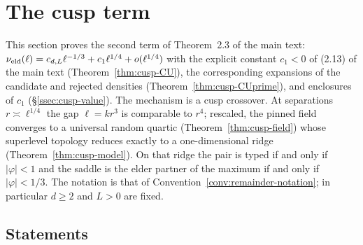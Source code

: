 \section{The cusp term}\label{sec:cusp}

This section proves the second term of Theorem~2.3 of the main text: $\nu_{\mathrm{eld}}(\ell)=c_{d,L}\ell^{-1/3}+c_1\ell^{1/4}+o(\ell^{1/4})$ with the explicit constant $c_1<0$ of (2.13) of the main text (Theorem~\ref{thm:cusp-CU}), the corresponding expansions of the candidate and rejected densities (Theorem~\ref{thm:cusp-CUprime}), and enclosures of $c_1$ (\S\ref{ssec:cusp-value}). The mechanism is a cusp crossover. At separations $r\asymp\ell^{1/4}$ the gap $\ell=kr^3$ is comparable to $r^4$; rescaled, the pinned field converges to a universal random quartic (Theorem~\ref{thm:cusp-field}) whose superlevel topology reduces exactly to a one-dimensional ridge (Theorem~\ref{thm:cusp-model}). On that ridge the pair is typed if and only if $|\varphi|<1$ and the saddle is the elder partner of the maximum if and only if $|\varphi|<1/3$. The notation is that of Convention~\ref{conv:remainder-notation}; in particular $d\ge2$ and $L>0$ are fixed.

\subsection{Statements}\label{ssec:cusp-statements}

